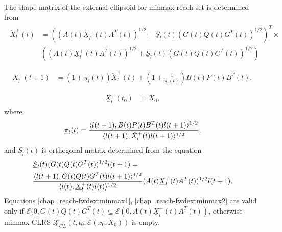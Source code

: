 \documentclass[letterpaper,10pt,english]{sphinxmanual}
\begin{document}
The shape matrix of the external ellipsoid for minmax reach set is
determined from
\label{chap_reach:equation-fwdextminmax1}\begin{gather}
\begin{split}\breve{X}^+_l(t) & =
\left((A(t)\underline{X}^+_l(t)A^T(t))^{1/2} +
\underline{S}_l(t)(G(t)Q(t)G^T(t))^{1/2}\right)^T
\times \nonumber \\
&\left((A(t)\underline{X}^+_l(t)A^T(t))^{1/2} +
\underline{S}_l(t)(G(t)Q(t)G^T(t))^{1/2}\right)\\\end{split}\label{chap_reach-fwdextminmax1}
\end{gather}\label{chap_reach:equation-fwdextminmax2}\begin{gather}
\begin{split}\underline{X}^+_l(t+1) & =
(1+\underline{\pi}_l(t))\breve{X}^+_l(t) +
\left(1+\frac{1}{\underline{\pi}_l(t)}\right)
B(t)P(t)B^T(t),\\\end{split}\label{chap_reach-fwdextminmax2}
\end{gather}\label{chap_reach:equation-fwdextminmax3}\begin{gather}
\begin{split}\underline{X}^+_l(t_0) & = X_0,\end{split}\label{chap_reach-fwdextminmax3}
\end{gather}
where
\begin{gather}
\begin{split}\underline{\pi}_l(t) = \frac{\langle l(t+1),
B(t)P(t)B^T(t)l(t+1)\rangle^{1/2}}{\langle l(t+1),
\breve{X}^+_l(t)l(t+1)\rangle^{1/2}},\end{split}\notag
\end{gather}
and \(\underline{S}_l(t)\) is orthogonal matrix determined from the
equation
\begin{gather}
\begin{split}\begin{aligned}
& \underline{S}_l(t)(G(t)Q(t)G^T(t))^{1/2}l(t+1) = \\
& \frac{\langle l(t+1),
G(t)Q(t)G^T(t)l(t+1)\rangle^{1/2}}{\langle l(t),
\underline{X}^+_l(t)l(t)\rangle^{1/2}}(A(t)\underline{X}^+_l(t)A^T(t))^{1/2}l(t+1).\end{aligned}\end{split}\notag
\end{gather}
Equations \eqref{chap_reach-fwdextminmax1}, \eqref{chap_reach-fwdextminmax2} are valid only if
\({\mathcal E}(0,G(t)Q(t)G^T(t)\subseteq{\mathcal E}(0,A(t)\underline{X}^+_l(t)A^T(t))\),
otherwise minmax CLRS
\(\underline{{\mathcal X}}_{CL}(t,t_0,{\mathcal E}(x_0,X_0))\) is
empty.
\end{document}
